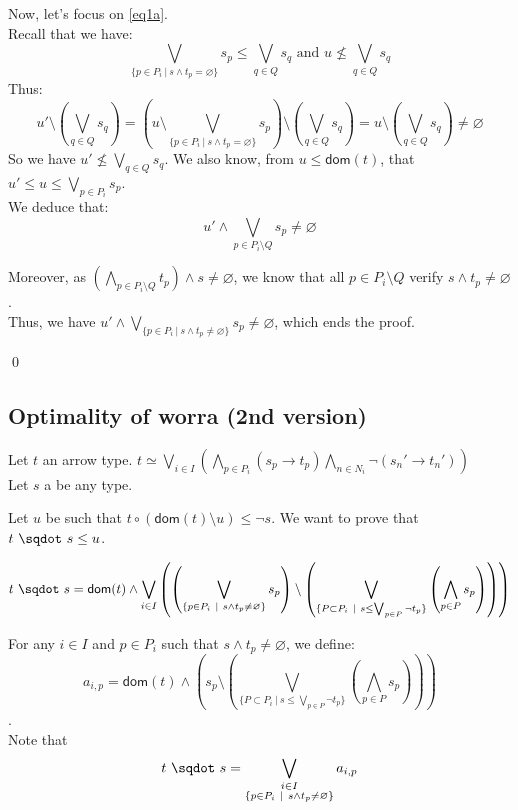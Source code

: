 \documentclass[a4paper]{article}%
\newcommand{\worra}[2]{#1\mathop{\,\sqdot\,} #2}
\newcommand{\apply}[2]{#1\circ#2}
\newcommand{\dom}[1]{\textsf{dom}(#1)}
\newcommand{\alt}{~|~}
\begin{document}
    Now, let's focus on \cref{eq1a}.\\
    Recall that we have:
    \[ \bigvee_{\{p \in P_i \alt s \land t_p = \varnothing\}}s_p \leq \bigvee_{q \in Q}s_q 
    \text{\ \ \ and\ \ \ } u \not\leq\bigvee_{q\in Q}s_q \]
    Thus:
    \[ u' \setminus \left(\bigvee_{q \in Q}s_q\right) = \left(u \setminus \bigvee_{\{p \in P_i \alt s \land t_p = \varnothing\}}s_p\right) \setminus \left(\bigvee_{q \in Q}s_q\right) = u \setminus \left(\bigvee_{q \in Q}s_q\right) \neq \varnothing \]
    So we have $ u' \not\leq\bigvee_{q\in Q}s_q $. We also know, from $u \leq \dom t$, that $u' \leq u \leq \bigvee_{p\in P_i}s_p$.\\

    We deduce that:
    \[ u' \land \bigvee_{p\in P_i \setminus Q}s_p \neq \varnothing \]

    Moreover, as $(\bigwedge_{p\in P_i\setminus Q}t_p) \land s \neq \varnothing$, we know that all $p \in P_i \setminus Q$ verify $s \land t_p \neq \varnothing$.\\
    Thus, we have $u' \land \bigvee_{\{p\in P_i\alt s\wedge t_p\not=\varnothing\}}s_p \neq \varnothing$, which ends the proof.
    
    \qed

    \pagebreak

    \subsection{Optimality of worra (2nd version)}

    Let $t$ an arrow type. $t \simeq \bigvee_{i\in I}\left(\bigwedge_{p\in P_i}(s_p\to t_p)\bigwedge_{n\in N_i}\neg(s_n'\to t_n')\right)$\\
    Let $s$ a be any type.

    Let $u$ be such that $\apply t {(\dom t \setminus u)} \leq \neg s$. We want to prove that $\worra t s \leq u$.

    \[\worra t s = \dom t \wedge\bigvee_{i\in I}\left(\left(\bigvee_{\{p\in P_i\alt s\wedge t_p\not=\varnothing\}}s_p\right) \setminus \left(\bigvee_{\{P \subset P_i\alt s \leq \bigvee_{p \in P} \neg t_p\}} \left(\bigwedge_{p \in P} s_p\right) \right)\right)\]

    For any $i \in I$ and $p \in P_i$ such that $s \land t_p \neq \varnothing$, we define:
    \[a_{i,p}=\dom t \land \left(s_p \setminus \left(\bigvee_{\{P \subset P_i\alt s \leq \bigvee_{p \in P} \neg t_p\}} \left(\bigwedge_{p \in P} s_p\right) \right)\right)\].\\
    Note that \[\worra t s = \bigvee_{\substack{i \in I\\ \{p \in P_i \alt s \land t_p \neq \varnothing\}}} a_{i,p} \]
\end{document}
